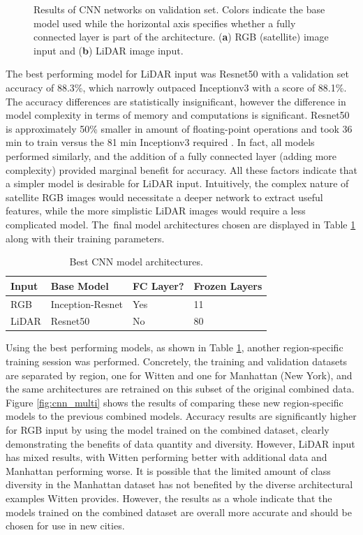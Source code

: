 \begin{figure}[ht]
    \caption[Results of CNN networks on validation set]{Results of CNN networks on validation set. Colors indicate the base model used while the horizontal axis specifies whether a fully connected layer is part of the architecture. (\textbf{a}) RGB (satellite) image input and (\textbf{b}) LiDAR image input.}
    \label{fig:cnn_val}
\end{figure}

The best performing model for LiDAR input was  Resnet50 with a validation set accuracy of 88.3\%, which narrowly outpaced Inceptionv3 with a score of 88.1\%. The accuracy differences are statistically insignificant, however the difference in model complexity in terms of memory and computations is significant.  Resnet50 is approximately 50\% smaller in amount of floating-point operations and took 36 min to train versus the 81 min Inceptionv3 required \cite{canziani_analysis_2017}.  In fact, all models performed similarly, and the addition of a fully connected layer (adding more complexity) provided marginal benefit for accuracy. All these factors indicate that a simpler model is desirable for LiDAR input.  Intuitively, the complex nature of satellite RGB images would necessitate a deeper network to extract useful features, while the more simplistic LiDAR images would require a less complicated model. The~final model architectures chosen are displayed in Table \ref{table:best_cnn_arch} along with their training parameters.

\begin{table}[H]
\centering
\caption{Best CNN model architectures.}\label{table:best_cnn_arch}
\begin{tabular}{llll}
\toprule
\textbf{Input} & \textbf{Base Model}       & \textbf{FC Layer?} & \textbf{Frozen Layers} \\ \midrule
RGB   & Inception-Resnet & Yes       & 11            \\
LiDAR & Resnet50         & No        & 80   \\
\bottomrule        
\end{tabular}
\end{table}


Using the best performing models, as shown in Table \ref{table:best_cnn_arch}, another region-specific training session was performed.  Concretely, the training and validation datasets are separated by region, one for Witten and one for Manhattan (New York), and the same architectures are retrained on this subset of the original combined data. Figure \ref{fig:cnn_multi} shows the results of comparing these new region-specific models to the previous combined models.  Accuracy results are significantly higher for RGB input by using the model trained on the combined dataset, clearly demonstrating the benefits of data quantity and diversity. However, LiDAR input has mixed results, with Witten performing better with additional data and Manhattan performing worse. It is possible that the limited amount of class diversity in the Manhattan dataset has not benefited by the diverse architectural examples Witten provides. However, the results as a whole indicate that the models trained on the combined dataset are overall more accurate and should be chosen for use in new cities. 


